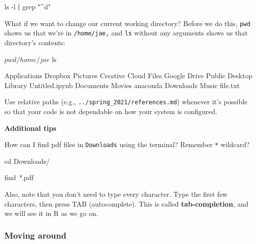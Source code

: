 \documentclass[
]{book}
\newenvironment{Shaded}{\begin{snugshade}}{\end{snugshade}}
\newcommand{\AttributeTok}[1]{\textcolor[rgb]{0.77,0.63,0.00}{#1}}
\newcommand{\BuiltInTok}[1]{#1}
\newcommand{\ExtensionTok}[1]{#1}
\newcommand{\FunctionTok}[1]{\textcolor[rgb]{0.00,0.00,0.00}{#1}}
\newcommand{\KeywordTok}[1]{\textcolor[rgb]{0.13,0.29,0.53}{\textbf{#1}}}
\newcommand{\NormalTok}[1]{#1}
\newcommand{\PreprocessorTok}[1]{\textcolor[rgb]{0.56,0.35,0.01}{\textit{#1}}}
\newcommand{\StringTok}[1]{\textcolor[rgb]{0.31,0.60,0.02}{#1}}
\begin{document}
\begin{Shaded}
\begin{Highlighting}[]
\FunctionTok{ls} \AttributeTok{{-}l} \KeywordTok{|} \FunctionTok{grep} \StringTok{"\^{}d"}
\end{Highlighting}
\end{Shaded}

What if we want to change our current working directory? Before we do this, \texttt{pwd} shows us that we're in \texttt{/home/jae,} and \texttt{ls} without any arguments shows us that directory's contents:

\begin{Shaded}
\begin{Highlighting}[]
\ExtensionTok{$}\NormalTok{ pwd}

\ExtensionTok{/home/jae}

\ExtensionTok{$}\NormalTok{ ls}

\ExtensionTok{Applications}\NormalTok{        Dropbox         Pictures}
\ExtensionTok{Creative}\NormalTok{ Cloud Files    Google Drive        Public}
\ExtensionTok{Desktop}\NormalTok{         Library         Untitled.ipynb}
\ExtensionTok{Documents}\NormalTok{       Movies          anaconda}
\ExtensionTok{Downloads}\NormalTok{       Music           file.txt}
\end{Highlighting}
\end{Shaded}

Use relative paths (e.g., \texttt{../spring\_2021/references.md}) whenever it's possible so that your code is not dependable on how your system is configured.

\textbf{Additional tips}

How can I find pdf files in \texttt{Downloads} using the terminal? Remember \texttt{*} wildcard?

\begin{Shaded}
\begin{Highlighting}[]
\BuiltInTok{cd}\NormalTok{ Downloads/ }

\FunctionTok{find} \PreprocessorTok{*}\NormalTok{.pdf}
\end{Highlighting}
\end{Shaded}

Also, note that you don't need to type every character. Type the first few characters, then press TAB (autocomplete). This is called \textbf{tab-completion}, and we will see it in R as we go on.

\hypertarget{moving-around}{%
\subsubsection{Moving around}\label{moving-around}}
\end{document}
